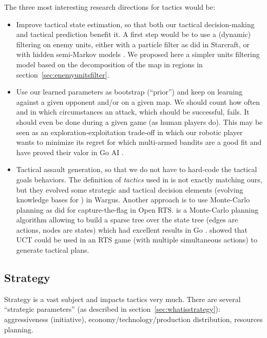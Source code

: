 The three most interesting research directions for tactics would be:
\begin{itemize}
    \item Improve tactical state estimation, so that both our tactical decision-making and tactical prediction benefit it. A first step would be to use a (dynamic) filtering on enemy units, either with a particle filter \citep{Thrun02d} as \cite{weber2011aiide} did in Starcraft, or with hidden semi-Markov models \citep{Hladky_anevaluation}. We proposed here a simpler units filtering model based on the decomposition of the map in regions in section~\ref{sec:enemyunitsfilter}.

    \item Use our learned parameters as bootstrap (``prior'') and keep on learning against a given opponent and/or on a given map. We should count how often and in which circumstances an attack, which should be successful, fails. It should even be done during a given game (as human players do). This may be seen as an exploration-exploitation trade-off in which our robotic player wants to minimize its regret for which multi-armed bandits \citep{Kuleshov2000} are a good fit and have proved their valor in Go AI \citep{GellySchoenauer}.

    \item Tactical assault generation, so that we do not have to hard-code the tactical goals behaviors. The definition of \textit{tactics} used in \citep{PonsenMSA06} is not exactly matching ours, but they evolved some strategic and tactical decision elements (evolving knowledge bases for ) in Wargus. Another approach is to use Monte-Carlo planning as \cite{Chung05} did for capture-the-flag in Open RTS.  is a Monte-Carlo planning algorithm allowing to build a sparse tree over the state tree (edges are actions, nodes are states) which had excellent results in Go \citep{GellyUCT,GellySchoenauer}. \cite{UCT} showed that UCT could be used in an RTS game (with multiple simultaneous actions) to generate tactical plans.
\end{itemize}


\subsection{Strategy}
Strategy is a vast subject and impacts tactics very much. There are several ``strategic parameters'' (as described in section~\ref{sec:whatisstrategy}): aggressiveness (initiative), economy/technology/production distribution, resources planning.

